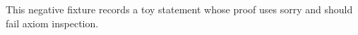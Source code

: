 This negative fixture records a toy statement whose proof uses sorry and should fail axiom inspection.
